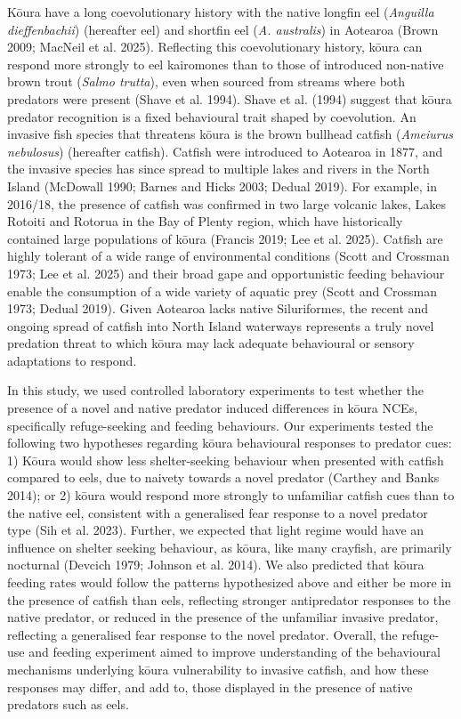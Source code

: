 \documentclass[
  12pt,
  a4paper,
]{scrbook}
\begin{document}
Kōura have a long coevolutionary history with the native longfin eel
(\emph{Anguilla dieffenbachii}) (hereafter eel) and shortfin eel
(\emph{A. australis}) in Aotearoa (Brown 2009; MacNeil et al. 2025).
Reflecting this coevolutionary history, kōura can respond more strongly
to eel kairomones than to those of introduced non-native brown trout
(\emph{Salmo trutta}), even when sourced from streams where both
predators were present (Shave et al. 1994). Shave et al. (1994) suggest
that kōura predator recognition is a fixed behavioural trait shaped by
coevolution. An invasive fish species that threatens kōura is the brown
bullhead catfish (\emph{Ameiurus nebulosus}) (hereafter catfish).
Catfish were introduced to Aotearoa in 1877, and the invasive species
has since spread to multiple lakes and rivers in the North Island
(McDowall 1990; Barnes and Hicks 2003; Dedual 2019). For example, in
2016/18, the presence of catfish was confirmed in two large volcanic
lakes, Lakes Rotoiti and Rotorua in the Bay of Plenty region, which have
historically contained large populations of kōura (Francis 2019; Lee et
al. 2025). Catfish are highly tolerant of a wide range of environmental
conditions (Scott and Crossman 1973; Lee et al. 2025) and their broad
gape and opportunistic feeding behaviour enable the consumption of a
wide variety of aquatic prey (Scott and Crossman 1973; Dedual 2019).
Given Aotearoa lacks native Siluriformes, the recent and ongoing spread
of catfish into North Island waterways represents a truly novel
predation threat to which kōura may lack adequate behavioural or sensory
adaptations to respond.

In this study, we used controlled laboratory experiments to test whether
the presence of a novel and native predator induced differences in kōura
NCEs, specifically refuge-seeking and feeding behaviours. Our
experiments tested the following two hypotheses regarding kōura
behavioural responses to predator cues: 1) Kōura would show less
shelter-seeking behaviour when presented with catfish compared to eels,
due to naivety towards a novel predator (Carthey and Banks 2014); or 2)
kōura would respond more strongly to unfamiliar catfish cues than to the
native eel, consistent with a generalised fear response to a novel
predator type (Sih et al. 2023). Further, we expected that light regime
would have an influence on shelter seeking behaviour, as kōura, like
many crayfish, are primarily nocturnal (Devcich 1979; Johnson et al.
2014). We also predicted that kōura feeding rates would follow the
patterns hypothesized above and either be more in the presence of
catfish than eels, reflecting stronger antipredator responses to the
native predator, or reduced in the presence of the unfamiliar invasive
predator, reflecting a generalised fear response to the novel predator.
Overall, the refuge-use and feeding experiment aimed to improve
understanding of the behavioural mechanisms underlying kōura
vulnerability to invasive catfish, and how these responses may differ,
and add to, those displayed in the presence of native predators such as
eels.
\end{document}
